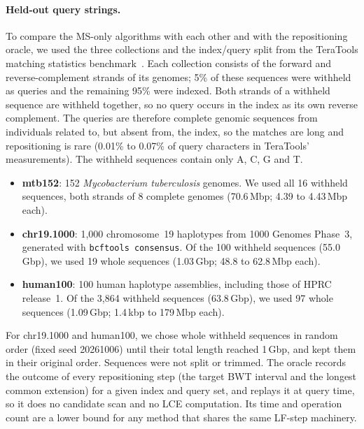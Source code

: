 
\paragraph{Held-out query strings.}
To compare the MS-only algorithms with each other and with the repositioning oracle, we used the three collections and the index/query split from the TeraTools matching statistics benchmark~\cite{teratools}.
Each collection consists of the forward and reverse-complement strands of its genomes; 5\% of these sequences were withheld as queries and the remaining 95\% were indexed.
Both strands of a withheld sequence are withheld together, so no query occurs in the index as its own reverse complement.
The queries are therefore complete genomic sequences from individuals related to, but absent from, the index, so the matches are long and repositioning is rare (0.01\% to 0.07\% of query characters in TeraTools' measurements).
The withheld sequences contain only A, C, G and T.
\begin{itemize}
  \item \textbf{mtb152}: 152 \textit{Mycobacterium tuberculosis} genomes. We used all 16 withheld sequences, both strands of 8 complete genomes (70.6\,Mbp; 4.39 to 4.43\,Mbp each).
  \item \textbf{chr19.1000}: 1{,}000 chromosome~19 haplotypes from 1000 Genomes Phase~3, generated with \texttt{bcftools consensus}. Of the 100 withheld sequences (55.0\,Gbp), we used 19 whole sequences (1.03\,Gbp; 48.8 to 62.8\,Mbp each).
  \item \textbf{human100}: 100 human haplotype assemblies, including those of HPRC release~1. Of the 3{,}864 withheld sequences (63.8\,Gbp), we used 97 whole sequences (1.09\,Gbp; 1.4\,kbp to 179\,Mbp each).
\end{itemize}
For chr19.1000 and human100, we chose whole withheld sequences in random order (fixed seed 20261006) until their total length reached 1\,Gbp, and kept them in their original order.
Sequences were not split or trimmed.
The oracle records the outcome of every repositioning step (the target BWT interval and the longest common extension) for a given index and query set, and replays it at query time, so it does no candidate scan and no LCE computation.
Its time and operation count are a lower bound for any method that shares the same LF-step machinery.

